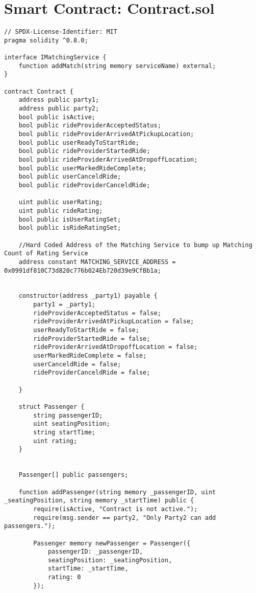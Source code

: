 \chapter{Smart Contract: Contract.sol}
\begin{lstlisting}
// SPDX-License-Identifier: MIT
pragma solidity ^0.8.0;

interface IMatchingService {
    function addMatch(string memory serviceName) external;
}

contract Contract {
    address public party1;
    address public party2;
    bool public isActive;
    bool public rideProviderAcceptedStatus;
    bool public rideProviderArrivedAtPickupLocation;
    bool public userReadyToStartRide;
    bool public rideProviderStartedRide;
    bool public rideProviderArrivedAtDropoffLocation;
    bool public userMarkedRideComplete;
    bool public userCanceldRide;
    bool public rideProviderCanceldRide;

    uint public userRating;
    uint public rideRating;
    bool public isUserRatingSet;
    bool public isRideRatingSet;

    //Hard Coded Address of the Matching Service to bump up Matching Count of Rating Service
    address constant MATCHING_SERVICE_ADDRESS = 0x0991df810C73d820c776b024Eb720d39e9CfBb1a;


    constructor(address _party1) payable {
        party1 = _party1;
        rideProviderAcceptedStatus = false;
        rideProviderArrivedAtPickupLocation = false;
        userReadyToStartRide = false;
        rideProviderStartedRide = false;
        rideProviderArrivedAtDropoffLocation = false;
        userMarkedRideComplete = false;
        userCanceldRide = false;
        rideProviderCanceldRide = false;

    }

    struct Passenger {
        string passengerID;
        uint seatingPosition;
        string startTime;
        uint rating;
    }


    Passenger[] public passengers;

    function addPassenger(string memory _passengerID, uint _seatingPosition, string memory _startTime) public {
        require(isActive, "Contract is not active.");
        require(msg.sender == party2, "Only Party2 can add passengers.");

        Passenger memory newPassenger = Passenger({
            passengerID: _passengerID,
            seatingPosition: _seatingPosition,
            startTime: _startTime,
            rating: 0
        });


\end{lstlisting}
